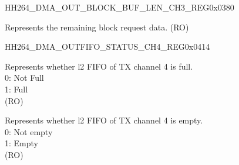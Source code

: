     
    \begin{register}{H}{H264\_DMA\_OUT\_BLOCK\_BUF\_LEN\_CH3\_REG}{0x0380}\label{regdesc:H264DMAOUTBLOCKBUFLENCH3REG}
    \regnewline%
    \begin{regdesc}\begin{reglist}
    \label{fielddesc:H264DMAOUTBLOCKBUFLENCH3}\item [H264\_DMA\_OUT\_BLOCK\_BUF\_LEN\_CH3] Represents the remaining block request data. (RO)
    \end{reglist}\end{regdesc}
    \end{register}
    
    \begin{register}{H}{H264\_DMA\_OUTFIFO\_STATUS\_CH4\_REG}{0x0414}\label{regdesc:H264DMAOUTFIFOSTATUSCH4REG}
    \regnewline%
    \begin{regdesc}\begin{reglist}
    \label{fielddesc:H264DMAOUTFIFOFULLL2CH4}\item [H264\_DMA\_OUTFIFO\_FULL\_L2\_CH4] Represents whether l2 FIFO of TX channel 4 is full.\\
    0: Not Full\\
    1: Full \\(RO)
    \label{fielddesc:H264DMAOUTFIFOEMPTYL2CH4}\item [H264\_DMA\_OUTFIFO\_EMPTY\_L2\_CH4] Represents whether l2 FIFO of TX channel 4 is empty.\\
    0: Not empty\\
    1: Empty\\ (RO)

\end{reglist}
\end{regdesc}
\end{register}

